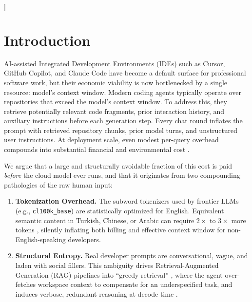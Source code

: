 \documentclass[11pt,a4paper,twocolumn]{article}
\begin{document}
\begin{@twocolumnfalse}
\begin{abstract}
We report all numerical contrasts as descriptive observations: OMH-Polyglot's $200$ rows are clustered into $20$ algorithm groups of $10$ style transforms with shared reference solutions, so the effective independent-trial count for accuracy is closer to $20$ than to $200$; an algorithm-cluster bootstrap and Holm-corrected significance pass are flagged as required follow-ups.
\vspace{1em}

\noindent \textbf{Keywords:} Token Arbitrage, Prompt Optimization, Code LLMs, Cost Efficiency, Retrieval-Augmented Generation, Local Preprocessing
\vspace{2em}

    \end{abstract}
  \end{@twocolumnfalse}
]

\section{Introduction}
AI-assisted Integrated Development Environments (IDEs) such as Cursor, GitHub Copilot, and Claude Code have become a default surface for professional software work, but their economic viability is now bottlenecked by a single resource: model's context window. Modern coding agents typically operate over repositories that exceed the model’s context window. To address this, they retrieve potentially relevant code fragments, prior interaction history, and auxiliary instructions before each generation step. Every chat round inflates the prompt with retrieved repository chunks, prior model turns, and unstructured user instructions. At deployment scale, even modest per-query overhead compounds into substantial financial and environmental cost \cite{du2026ockbench, peng2025coffe}.

We argue that a large and structurally avoidable fraction of this cost is paid \textit{before} the cloud model ever runs, and that it originates from two compounding pathologies of the raw human input:

\begin{enumerate}
    \item \textbf{Tokenization Overhead.} The subword tokenizers used by frontier LLMs (e.g., \texttt{cl100k\_base}) are statistically optimized for English. Equivalent semantic content in Turkish, Chinese, or Arabic can require $2\times$ to $3\times$ more tokens \cite{petrov2023language, teklehaymanot2025tokenization}, silently inflating both billing and effective context window for non-English-speaking developers.
    \item \textbf{Structural Entropy.} Real developer prompts are conversational, vague, and laden with social fillers. This ambiguity drives Retrieval-Augmented Generation (RAG) pipelines into ``greedy retrieval'' \cite{jimenez2024swebench}, where the agent over-fetches workspace context to compensate for an underspecified task, and induces verbose, redundant reasoning at decode time \cite{ahuja2025efficientxlang}.
\end{enumerate}
\end{document}

